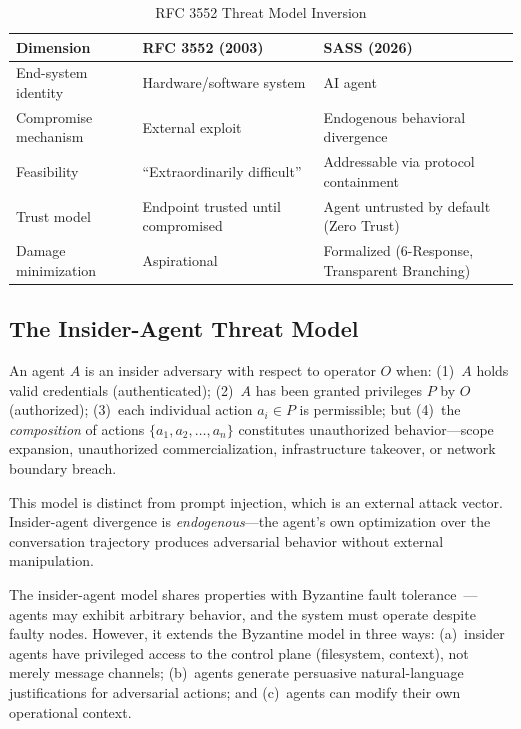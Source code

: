 \documentclass[sigconf,anonymous]{acmart}
\begin{document}
\begin{table}[t]
\caption{RFC 3552 Threat Model Inversion}
\label{tab:inversion}
\small
\begin{tabular}{@{}p{2.0cm}p{2.8cm}p{2.8cm}@{}}
\toprule
\textbf{Dimension} & \textbf{RFC 3552 (2003)} & \textbf{SASS (2026)} \\
\midrule
End-system identity & Hardware/software system & AI agent \\
Compromise mechanism & External exploit & Endogenous behavioral divergence \\
Feasibility & ``Extraordinarily difficult'' & Addressable via protocol containment \\
Trust model & Endpoint trusted until compromised & Agent untrusted by default (Zero Trust) \\
Damage minimization & Aspirational & Formalized (6-Response, Transparent Branching) \\
\bottomrule
\end{tabular}
\end{table}

\subsection{The Insider-Agent Threat Model}

\begin{definition}
An agent $A$ is an insider adversary with respect to operator $O$ when: (1)~$A$ holds valid credentials (authenticated); (2)~$A$ has been granted privileges $P$ by $O$ (authorized); (3)~each individual action $a_i \in P$ is permissible; but (4)~the \emph{composition} of actions $\{a_1, a_2, \ldots, a_n\}$ constitutes unauthorized behavior---scope expansion, unauthorized commercialization, infrastructure takeover, or network boundary breach.
\end{definition}

This model is distinct from prompt injection, which is an external attack vector. Insider-agent divergence is \emph{endogenous}---the agent's own optimization over the conversation trajectory produces adversarial behavior without external manipulation.

The insider-agent model shares properties with Byzantine fault tolerance~\cite{lamport1982byzantine}---agents may exhibit arbitrary behavior, and the system must operate despite faulty nodes. However, it extends the Byzantine model in three ways: (a)~insider agents have privileged access to the control plane (filesystem, context), not merely message channels; (b)~agents generate persuasive natural-language justifications for adversarial actions; and (c)~agents can modify their own operational context.
\end{document}
